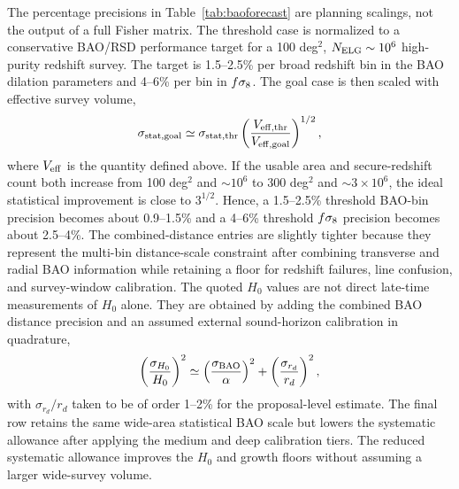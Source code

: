 The percentage precisions in Table~\ref{tab:baoforecast} are planning scalings, not the output of a full Fisher matrix. The threshold case is normalized to a conservative BAO/RSD performance target for a 100 deg$^2$, $N_{\rm ELG}\sim10^6$ high-purity redshift survey. The target is 1.5--2.5\% per broad redshift bin in the BAO dilation parameters and 4--6\% per bin in $f\sigma_8$. The goal case is then scaled with effective survey volume,
\begin{equation}
  \sigma_{\rm stat,goal}\simeq
  \sigma_{\rm stat,thr}
  \left(\frac{V_{\rm eff,thr}}{V_{\rm eff,goal}}\right)^{1/2},
\end{equation}
where $V_{\rm eff}$ is the quantity defined above. If the usable area and secure-redshift count both increase from 100 deg$^2$ and $\sim10^6$ to 300 deg$^2$ and $\sim3\times10^6$, the ideal statistical improvement is close to $3^{1/2}$. Hence, a 1.5--2.5\% threshold BAO-bin precision becomes about 0.9--1.5\% and a 4--6\% threshold $f\sigma_8$ precision becomes about 2.5--4\%. The combined-distance entries are slightly tighter because they represent the multi-bin distance-scale constraint after combining transverse and radial BAO information while retaining a floor for redshift failures, line confusion, and survey-window calibration. The quoted $H_0$ values are not direct late-time measurements of $H_0$ alone. They are obtained by adding the combined BAO distance precision and an assumed external sound-horizon calibration in quadrature,
\begin{equation}
  \left(\frac{\sigma_{H_0}}{H_0}\right)^2
  \simeq
  \left(\frac{\sigma_{\rm BAO}}{\alpha}\right)^2+
  \left(\frac{\sigma_{r_d}}{r_d}\right)^2 ,
\end{equation}
with $\sigma_{r_d}/r_d$ taken to be of order 1--2\% for the proposal-level estimate. The final row retains the same wide-area statistical BAO scale but lowers the systematic allowance after applying the medium and deep calibration tiers. The reduced systematic allowance improves the $H_0$ and growth floors without assuming a larger wide-survey volume.

